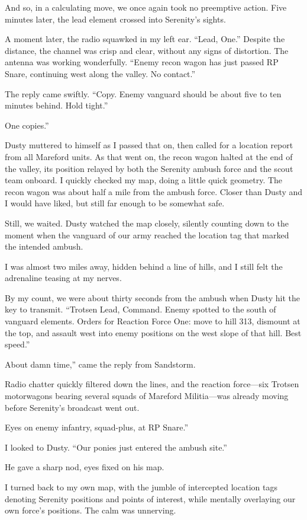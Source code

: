 And so, in a calculating move, we once again took no preemptive action. Five minutes later, the lead element crossed into Serenity’s sights.

A moment later, the radio squawked in my left ear. “Lead, One.” Despite the distance, the channel was crisp and clear, without any signs of distortion. The antenna was working wonderfully. “Enemy recon wagon has just passed RP Snare, continuing west along the valley. No contact.”

The reply came swiftly. “Copy. Enemy vanguard should be about five to ten minutes behind. Hold tight.”

\leavevmode{}One copies.”

Dusty muttered to himself as I passed that on, then called for a location report from all Mareford units. As that went on, the recon wagon halted at the end of the valley, its position relayed by both the Serenity ambush force and the scout team onboard. I quickly checked my map, doing a little quick geometry. The recon wagon was about half a mile from the ambush force. Closer than Dusty and I would have liked, but still far enough to be somewhat safe.

Still, we waited. Dusty watched the map closely, silently counting down to the moment when the vanguard of our army reached the location tag that marked the intended ambush.

I was almost two miles away, hidden behind a line of hills, and I still felt the adrenaline teasing at my nerves.

By my count, we were about thirty seconds from the ambush when Dusty hit the key to transmit. “Trotsen Lead, Command. Enemy spotted to the south of vanguard elements. Orders for Reaction Force One: move to hill 313, dismount at the top, and assault west into enemy positions on the west slope of that hill. Best speed.”

\leavevmode{}About damn time,” came the reply from Sandstorm.

Radio chatter quickly filtered down the lines, and the reaction force—six Trotsen motorwagons bearing several squads of Mareford Militia—was already moving before Serenity’s broadcast went out.

\leavevmode{}Eyes on enemy infantry, squad-plus, at RP Snare.”

I looked to Dusty. “Our ponies just entered the ambush site.”

He gave a sharp nod, eyes fixed on his map.

I turned back to my own map, with the jumble of intercepted location tags denoting Serenity positions and points of interest, while mentally overlaying our own force’s positions. The calm was unnerving.

